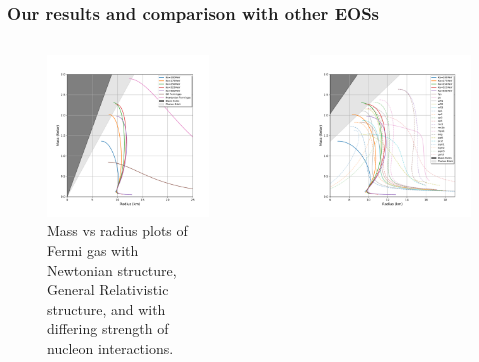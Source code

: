 \documentclass[hperref={pdfpagelabels=false}]{beamer}
\begin{document}
\begin{frame}
 \frametitle{Our results and comparison with other EOSs}
 \begin{columns}
  \begin{column}{0.48\textwidth}
  \begin{figure}
    \includegraphics[scale=0.3]{eos_compare_our_model.pdf}
    \caption{Mass vs radius plots of Fermi gas with Newtonian structure, General Relativistic structure, and with differing strength of nucleon interactions.}\label{fig/ourmodel}
  \end{figure}
  \end{column}
  \begin{column}{0.48\textwidth}
  \begin{figure}
    \includegraphics[scale=0.3]{eos_compare_paper.pdf}

\end{figure}
\end{column}
\end{columns}
\end{frame}
\end{document}

